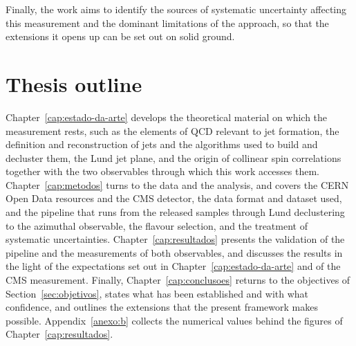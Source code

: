 Finally, the work aims to identify the sources of systematic uncertainty affecting
this measurement and the dominant limitations of the approach, so that the
extensions it opens up can be set out on solid ground.

\section{Thesis outline}
\label{sec:estrutura}

Chapter~\ref{cap:estado-da-arte} develops the theoretical material on which the
measurement rests, such as the elements of QCD relevant to jet formation, the
definition and reconstruction of jets and the algorithms used to build and
decluster them, the Lund jet plane, and the origin of collinear spin correlations
together with the two observables through which this work accesses them.
Chapter~\ref{cap:metodos} turns to the data and the analysis, and covers the CERN
Open Data resources and the CMS detector, the data format and dataset used, and
the pipeline that runs from the released samples through Lund declustering to the
azimuthal observable, the flavour selection, and the treatment of systematic
uncertainties. Chapter~\ref{cap:resultados} presents the validation of the
pipeline and the measurements of both observables, and discusses the results in
the light of the expectations set out in Chapter~\ref{cap:estado-da-arte} and of
the CMS measurement. Finally, Chapter~\ref{cap:conclusoes} returns to the
objectives of Section~\ref{sec:objetivos}, states what has been established and
with what confidence, and outlines the extensions that the present framework makes
possible. Appendix~\ref{anexo:b} collects the numerical values behind the figures
of Chapter~\ref{cap:resultados}.